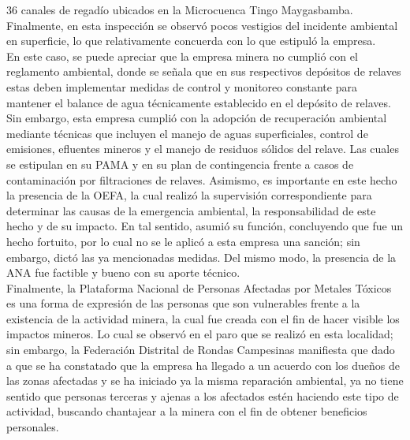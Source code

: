 \documentclass[12pt, a4paper]{article} %
\begin{document}
\begin{multicols}{2}
36 canales de regadío ubicados en la Microcuenca Tingo Maygasbamba. Finalmente, en esta inspección se observó pocos vestigios del incidente ambiental en superficie, lo que relativamente concuerda con lo que estipuló la empresa. \\En este caso, se puede apreciar que la empresa minera no cumplió con el reglamento ambiental, donde se señala que en sus respectivos depósitos de relaves estas deben implementar medidas de control y monitoreo constante para mantener el balance de agua técnicamente establecido en el depósito de relaves. Sin embargo, esta empresa cumplió con la adopción de recuperación ambiental mediante técnicas que incluyen el manejo de aguas superficiales, control de emisiones, efluentes mineros y el manejo de residuos sólidos del relave. Las cuales se estipulan en su PAMA y en su plan de contingencia frente a casos de contaminación por filtraciones de relaves. Asimismo, es importante en este hecho la presencia de la OEFA, la cual realizó la supervisión correspondiente para determinar las causas de la emergencia ambiental, la responsabilidad de este hecho y de su impacto. En tal sentido, asumió su función, concluyendo que fue un hecho fortuito, por lo cual no se le aplicó a esta empresa una sanción; sin embargo, dictó las ya mencionadas medidas. Del mismo modo, la presencia de la ANA fue factible y bueno con su aporte técnico. \\Finalmente, la Plataforma Nacional de Personas Afectadas por Metales Tóxicos es una forma de expresión de las personas que son vulnerables frente a la existencia de la actividad minera, la cual fue creada con el fin de hacer visible los impactos mineros. Lo cual se observó en el paro que se realizó en esta localidad; sin embargo, la Federación Distrital de Rondas Campesinas manifiesta que dado a que se ha constatado que la empresa ha llegado a un acuerdo con los dueños de las zonas afectadas y se ha iniciado ya la misma reparación ambiental, ya no tiene sentido que personas terceras y ajenas a los afectados estén haciendo este tipo de actividad, buscando chantajear a la minera con el fin de obtener beneficios personales.

\end{multicols}
\end{document}

